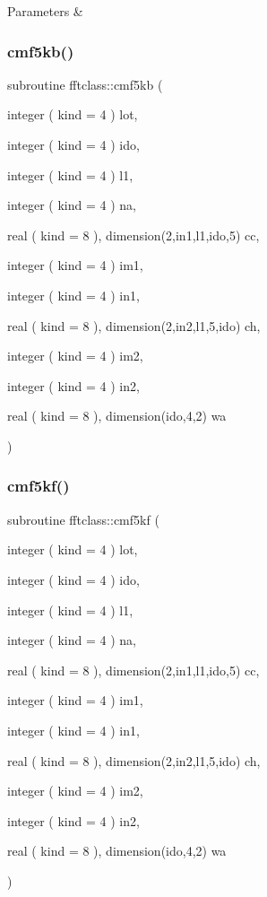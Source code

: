 \begin{DoxyParams}{Parameters}
{\em } & \\
\hline
\end{DoxyParams}
\mbox{\label{namespacefftclass_a4bf0caaf1c5caeb50490706cd35d82c5}} 
\subsubsection{\texorpdfstring{cmf5kb()}{cmf5kb()}}
{\footnotesize\ttfamily subroutine fftclass\+::cmf5kb (\begin{DoxyParamCaption}\item[{integer ( kind = 4 )}]{lot,  }\item[{integer ( kind = 4 )}]{ido,  }\item[{integer ( kind = 4 )}]{l1,  }\item[{integer ( kind = 4 )}]{na,  }\item[{real ( kind = 8 ), dimension(2,in1,l1,ido,5)}]{cc,  }\item[{integer ( kind = 4 )}]{im1,  }\item[{integer ( kind = 4 )}]{in1,  }\item[{real ( kind = 8 ), dimension(2,in2,l1,5,ido)}]{ch,  }\item[{integer ( kind = 4 )}]{im2,  }\item[{integer ( kind = 4 )}]{in2,  }\item[{real ( kind = 8 ), dimension(ido,4,2)}]{wa }\end{DoxyParamCaption})}

\mbox{\label{namespacefftclass_a59cb57b66516dd0b08cf36e366933c56}} 
\subsubsection{\texorpdfstring{cmf5kf()}{cmf5kf()}}
{\footnotesize\ttfamily subroutine fftclass\+::cmf5kf (\begin{DoxyParamCaption}\item[{integer ( kind = 4 )}]{lot,  }\item[{integer ( kind = 4 )}]{ido,  }\item[{integer ( kind = 4 )}]{l1,  }\item[{integer ( kind = 4 )}]{na,  }\item[{real ( kind = 8 ), dimension(2,in1,l1,ido,5)}]{cc,  }\item[{integer ( kind = 4 )}]{im1,  }\item[{integer ( kind = 4 )}]{in1,  }\item[{real ( kind = 8 ), dimension(2,in2,l1,5,ido)}]{ch,  }\item[{integer ( kind = 4 )}]{im2,  }\item[{integer ( kind = 4 )}]{in2,  }\item[{real ( kind = 8 ), dimension(ido,4,2)}]{wa }\end{DoxyParamCaption})}

